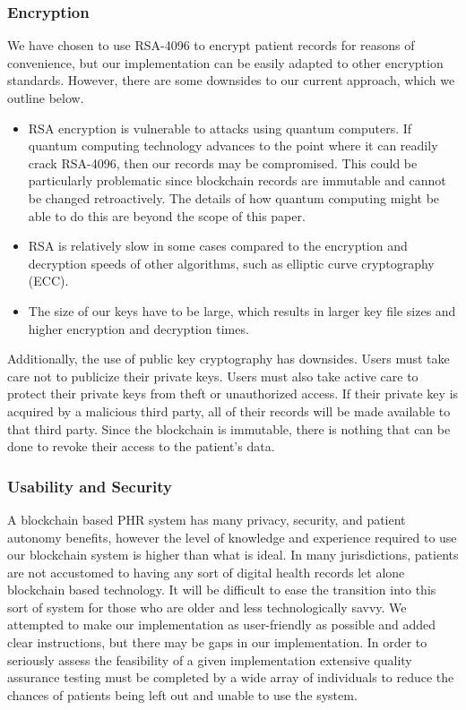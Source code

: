 \documentclass{article}
\begin{document}
\subsubsection{Encryption}
\label{limitations:encryption}
We have chosen to use RSA-4096 to encrypt patient records for reasons of convenience, but our implementation can be easily adapted to other encryption standards. However, there are some downsides to our current approach, which we outline below.
\begin{itemize}
    \item RSA encryption is vulnerable to attacks using quantum computers. If quantum computing technology advances to the point where it can readily crack RSA-4096, then our records may be compromised. This could be particularly problematic since blockchain records are immutable and cannot be changed retroactively. The details of how quantum computing might be able to do this are beyond the scope of this paper.
    \item RSA is relatively slow in some cases compared to the encryption and decryption speeds of other algorithms, such as elliptic curve cryptography (ECC).
    \item The size of our keys have to be large, which results in larger key file sizes and higher encryption and decryption times.
\end{itemize}

Additionally, the use of public key cryptography has downsides. Users must take care not to publicize their private keys. Users must also take active care to protect their private keys from theft or unauthorized access. If their private key is acquired by a malicious third party, all of their records will be made available to that third party. Since the blockchain is immutable, there is nothing that can be done to revoke their access to the patient's data.

\subsubsection{Usability and Security}
A blockchain based PHR system has many privacy, security, and patient autonomy benefits, however the level of knowledge and experience required to use our blockchain system is higher than what is ideal. In many jurisdictions, patients are not accustomed to having any sort of digital health records let alone blockchain based technology. It will be difficult to ease the transition into this sort of system for those who are older and less technologically savvy. We attempted to make our implementation as user-friendly as possible and added clear instructions, but there may be gaps in our implementation. In order to seriously assess the feasibility of a given implementation extensive quality assurance testing must be completed by a wide array of individuals to reduce the chances of patients being left out and unable to use the system.
\end{document}

